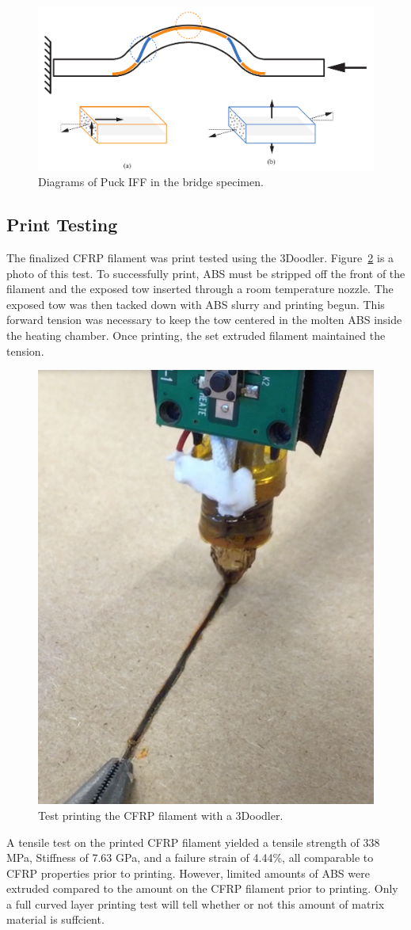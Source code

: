\begin{figure}[t]
\centering
\includegraphics[width=0.8\linewidth]{./figures/fea/puck-failure-qualitative}
\caption{Diagrams of Puck IFF in the bridge specimen.}
\label{fig:puck-failure-qualitative}
\end{figure}


\subsection*{Print Testing}

The finalized CFRP filament was print tested using the 3Doodler. Figure~\ref{fig:filament-print-3doodler-during} is a photo of this test. To successfully print, ABS must be stripped off the front of the filament and the exposed tow inserted through a room temperature nozzle. The exposed tow was then tacked down with ABS slurry and printing begun. This forward tension was necessary to keep the tow centered in the molten ABS inside the heating chamber. Once printing, the set extruded filament maintained the tension.

\begin{figure}[t]
\centering
\includegraphics[width=0.5\linewidth]{./figures/filament-print-3doodler-during}
\caption{Test printing the CFRP filament with a 3Doodler.}
\label{fig:filament-print-3doodler-during}
\end{figure}

A tensile test on the printed CFRP filament yielded a tensile strength of 338 MPa, Stiffness of 7.63 GPa, and a failure strain of 4.44\%, all comparable to CFRP properties prior to printing. However, limited amounts of ABS were extruded compared to the amount on the CFRP filament prior to printing. Only a full curved layer printing test will tell whether or not this amount of matrix material is suffcient. 